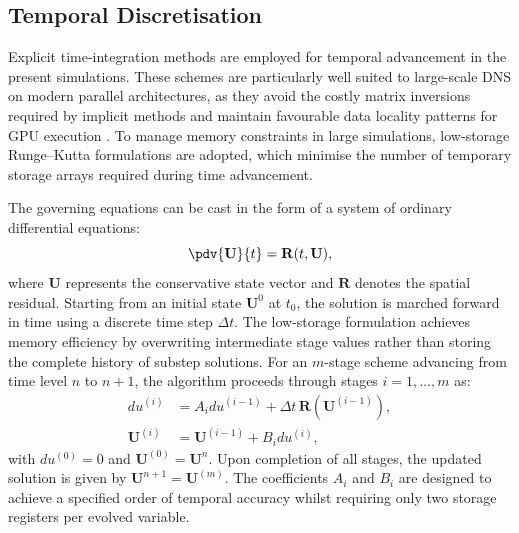 \subsection{Temporal Discretisation}

Explicit time-integration methods are employed for temporal advancement in the present simulations. These schemes are particularly well suited to large-scale \gls{DNS} on modern parallel architectures, as they avoid the costly matrix inversions required by implicit methods and maintain favourable data locality patterns for GPU execution \citep{KennedyCarpenterLewis2000}. To manage memory constraints in large simulations, low-storage Runge--Kutta formulations are adopted, which minimise the number of temporary storage arrays required during time advancement.

The governing equations can be cast in the form of a system of ordinary differential equations:
\begin{equation}
    \pdv{\mathbf{U}}{t} = \mathbf{R}(t, \mathbf{U}),
\end{equation}
where $\mathbf{U}$ represents the conservative state vector and $\mathbf{R}$ denotes the spatial residual. Starting from an initial state $\mathbf{U}^0$ at $t_0$, the solution is marched forward in time using a discrete time step $\Delta t$. The \cite{Williamson1980} low-storage formulation achieves memory efficiency by overwriting intermediate stage values rather than storing the complete history of substep solutions. For an $m$-stage scheme advancing from time level $n$ to $n+1$, the algorithm proceeds through stages $i=1,\ldots,m$ as:
\begin{align}
    du^{(i)} &= A_i du^{(i-1)} + \Delta t \, \mathbf{R}\!\left(\mathbf{U}^{(i-1)}\right), \\
    \mathbf{U}^{(i)} &= \mathbf{U}^{(i-1)} + B_i du^{(i)},
\end{align}
with $du^{(0)}=0$ and $\mathbf{U}^{(0)} = \mathbf{U}^n$. Upon completion of all stages, the updated solution is given by $\mathbf{U}^{n+1} = \mathbf{U}^{(m)}$. The coefficients $A_i$ and $B_i$ are designed to achieve a specified order of temporal accuracy whilst requiring only two storage registers per evolved variable.

